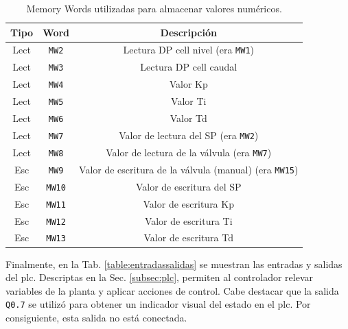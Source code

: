 \begin{table}[!t]

\renewcommand{\arraystretch}{1.3}
\centering
\begin{tabular}{c||c||c}
\hline
\bfseries Tipo & \bfseries Word  & \bfseries Descripción\\
\hline \hline
Lect & \verb|MW2|  & Lectura DP cell nivel (era \verb|MW1|)\\
Lect & \verb|MW3|  & Lectura DP cell caudal\\
Lect & \verb|MW4|  & Valor Kp\\
Lect & \verb|MW5|  & Valor Ti\\
Lect & \verb|MW6|  & Valor Td\\
Lect & \verb|MW7|  & Valor de lectura del SP (era \verb|MW2|)\\
Lect & \verb|MW8|  & Valor de lectura de la válvula (era \verb|MW7|)\\
\hline
Esc & \verb|MW9| & Valor de escritura de la válvula (manual) (era 
\verb|MW15|) \\
Esc & \verb|MW10|  & Valor de escritura del SP \\
Esc & \verb|MW11|  & Valor de escritura Kp \\
Esc & \verb|MW12|  & Valor de escritura Ti \\
Esc & \verb|MW13| & Valor de escritura Td \\
\hline
\end{tabular}
\caption{Memory Words utilizadas para almacenar valores numéricos.}
\label{table:mwNumericos}
\end{table}

Finalmente, en la Tab. \ref{table:entradassalidas} se muestran las entradas y
salidas del \gls{plc}.
Descriptas en la Sec. \ref{subsec:plc}, permiten al
controlador relevar variables de la planta y aplicar acciones de control.
Cabe destacar que la salida \verb|Q0.7| se utilizó para obtener un indicador
visual del estado en el \gls{plc}.
Por consiguiente, esta salida no está conectada.

